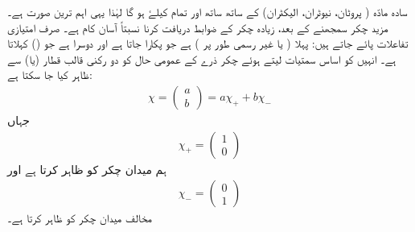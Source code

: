 سادہ مادّہ ( پروٹان، نیوٹران، الیکٹران) کے ساتھ ساتھ  اور تمام  کیلۓ  ہو گا لہٰذا یہی اہم ترین صورت ہے۔ مزید چکر سمجھنے کے بعد، زیادہ چکر کے ضوابط دریافت کرنا نسبتاً آسان کام ہے۔ صرف  امتیازی تفاعلات پائے جاتے ہیں: پہلا  ( یا غیر رسمی طور پر ) ہے جو پکارا جاتا ہے اور دوسرا  ہے جو  () کہلاتا ہے۔ انہیں کو اساس سمتیات لیتے ہوئے  چکر ذرے کے عمومی حال کو دو رکنی قالب قطار (یا) سے ظاہر کیا جا سکتا ہے:
\begin{align}\label{مساوات_تین_بعدی_عمومی_حال_چائے}
 \chi=\begin{pmatrix} a \\ b \end{pmatrix}= a\chi_{+} + b\chi_{-} 
 \end{align}
جہاں
\begin{align} 
 \chi_{+}=\begin{pmatrix}1\\0 \end{pmatrix}
 \end{align}
ہم میدان چکر کو ظاہر کرتا ہے اور 
\begin{align} 
 \chi_{-}=\begin{pmatrix}0 \\1 \end{pmatrix}
 \end{align}
مخالف میدان چکر کو ظاہر کرتا ہے۔

